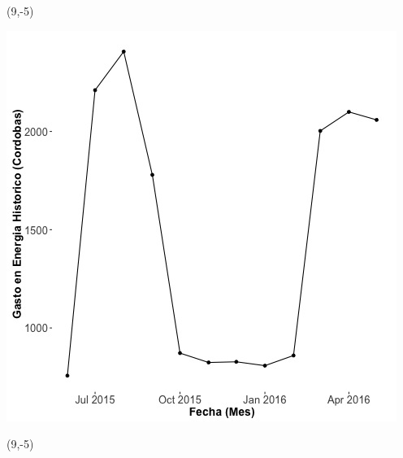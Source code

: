 \documentclass{article}\usepackage[]{graphicx}\usepackage[]{color}
\newenvironment{knitrout}{}{} %
\begin{document}
 \begin{textblock}{1}(9,-5)
\begin{minipage}{20em}
\begingroup

\endgroup
\end{minipage}
\end{textblock}

\begin{knitrout}
\color{fgcolor}
\includegraphics[scale=0.65]{figure/A19_historico_cordobas} 
\end{knitrout}

 \begin{textblock}{1}(9,-5)
\begin{minipage}{20em}
\begingroup

\endgroup
\end{minipage}
\end{textblock}
\end{document}
